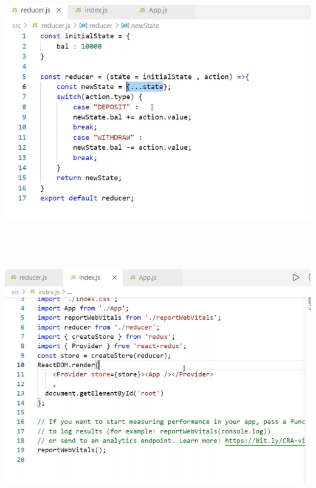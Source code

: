 \documentclass{article}
\begin{document}
\begin{center}
	\noindent \includegraphics*[width=6.24in, height=4.35in]{IMG-11-06}\textbf{}

	\noindent \includegraphics*[width=6.24in, height=4.35in]{IMG-11-07}\textbf{}
\end{center}

\noindent 
\end{document}
